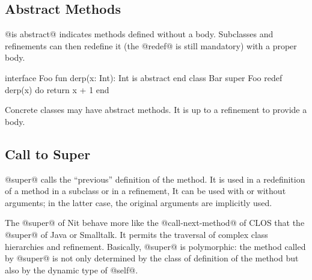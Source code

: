 \subsection{Abstract Methods}\label{abstract}

@is abstract@ indicates methods defined without a body.
Subclasses and refinements can then redefine it (the @redef@ is still mandatory) with a proper body.

\begin{lst}
interface Foo
	fun derp(x: Int): Int is abstract
end
class Bar
	super Foo
	redef derp(x) do return x + 1
end
\end{lst}

Concrete classes may have abstract methods.
It is up to a refinement to provide a body.

\subsection{Call to Super}\label{super}

@super@ calls the ``previous'' definition of the method.
It is used in a redefinition of a method in a subclass or in a refinement,
It can be used with or without arguments; in the latter case, the original arguments are implicitly used.

The @super@ of Nit behave more like the @call-next-method@ of CLOS that the @super@ of Java or Smalltalk.
It permits the traversal of complex class hierarchies and refinement.
Basically, @super@ is polymorphic: the method called by @super@ is not only determined by the class of definition of the method but also by the dynamic type of @self@.


